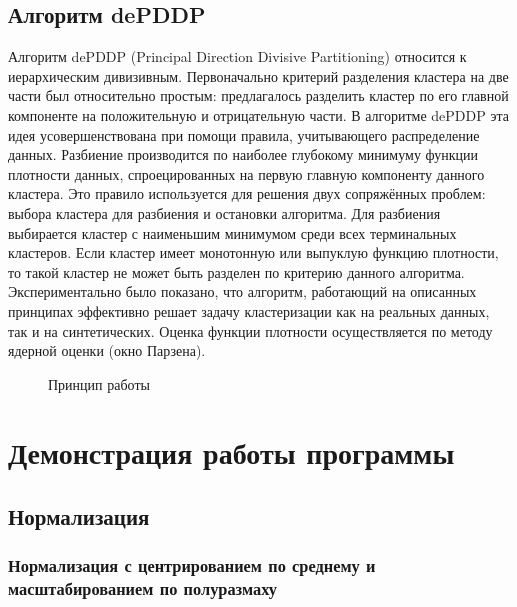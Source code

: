\documentclass[12pt,tikz]{instruction}
\begin{document}
\subsection{Алгоритм dePDDP} 
Алгоритм dePDDP (Principal Direction Divisive Partitioning) относится к иерархическим дивизивным. Первоначально критерий разделения кластера на две части был относительно простым: предлагалось разделить кластер по его главной компоненте на положительную и отрицательную части. В алгоритме dePDDP эта идея усовершенствована при помощи правила, учитывающего распределение данных. Разбиение производится по наиболее глубокому минимуму функции плотности данных, спроецированных на первую главную компоненту данного кластера. Это правило используется для решения двух сопряжённых проблем: выбора кластера для разбиения и остановки алгоритма. Для разбиения выбирается кластер с наименьшим минимумом среди всех терминальных кластеров. Если кластер имеет монотонную или выпуклую функцию плотности, то такой кластер не может быть разделен по критерию данного алгоритма. Экспериментально было показано, что алгоритм, работающий на описанных принципах эффективно решает задачу кластеризации как на реальных данных, так и на 
синтетических. Оценка функции плотности осуществляется по методу ядерной оценки (окно Парзена).

\begin{figure} %
	\centering
	\subfigure[]{\label{fig:ward1}}
	\subfigure[]{\label{fig:ward2}}
	\subfigure[]{\label{fig:ward3}}
	\subfigure[]{\label{fig:ward4}}
	\subfigure[]{\label{fig:ward4}}
	\subfigure[]{\label{fig:ward4}}
	\caption{Принцип работы \dePDDP}
	\label{fig:depddp-working}
\end{figure}

\section{Демонстрация работы программы}
\subsection{Нормализация}
\subsubsection{Нормализация с центрированием по среднему и масштабированием по полуразмаху}
\label{subsubseq:example_norm1}
\end{document}
